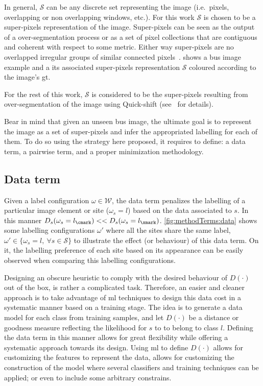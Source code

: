 In general, $\mathcal{S}$ can be any discrete set representing the image (i.e.\, pixels, overlapping or non overlapping windows, etc.). 
For this work $\mathcal{S}$ is chosen to be a super-pixels representation of the image.
Super-pixels can be seen as the output of a over-segmentation process or as a set of pixel collections that are contiguous and coherent with respect to some metric. Either way super-pixels are no overlapped irregular groups of similar connected pixels~\cite{achanta2012slic}.
 shows a \ac{bus} image example and a its associated super-pixels representation $\mathcal{S}$ coloured according to the image's \ac{gt}.

For the rest of this work, $\mathcal{S}$ is considered to be the super-pixels resulting from over-segmentation of the image using Quick-shift (see~\cite{sikphd} for details). 

Bear in mind that given an unseen \ac{bus} image, the ultimate goal is to represent the image as a set of super-pixels and infer the appropriated labelling for each of them.
To do so using the strategy here proposed, it requires to define: a data term, a pairwise term, and a proper minimization methodology.

\subsection{Data term} \label{sec:method:dataTerm}

Given a label configuration $\omega \in \mathcal{W}$, the data term penalizes the 
labelling of a particular image element or site ($\omega_s = l$) based on the data associated to $s$. 
In this manner $D_s(\omega_s=l_\cmark) << D_s(\omega_s=l_\xmark)$. 
\cref{fig:methodTerms:data} shows some labelling configurations $\omega'$ where all the sites share the same label, $\omega' \in \{ \omega_s=l,~\forall s\in\mathcal{S}\}$ to illustrate the effect (or behaviour) of this data term.
On it, the labelling preference of each site based on its appearance can be easily observed when comparing this labelling configurations.

Designing an obscure heuristic to comply with the desired behaviour of $D(\cdot)$ out of the box, is rather a complicated task.
Therefore, an easier and cleaner approach is to take advantage of \ac{ml} techniques to design this data cost in a systematic manner based on a training stage. 
The idea is to generate a data model for each class from training samples, and let $D(\cdot)$ be a distance or goodness measure reflecting the likelihood for $s$ to to belong to class $l$.
Defining the data term in this manner allows for great flexibility while offering a systematic approach towards its design.  
Using \ac{ml} to define $D(\cdot)$ allows for customizing the features to represent the data, allows for customizing the construction of the model where several classifiers and training techniques can be applied; or even to include some arbitrary constrains.

